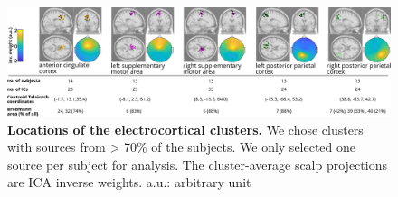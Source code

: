 \documentclass[shortpaper,twoside,web]{ieeecolor}
\begin{document}
\begin{figure}[!ht]
\centerline{\includegraphics{figures/05_dipole locations_70p.jpg}}
\caption{\textbf{Locations of the electrocortical clusters.} We chose clusters with sources from > 70\% of the subjects. We only selected one source per subject for analysis. The cluster-average scalp projections are ICA inverse weights. a.u.: arbitrary unit}
\label{fig5}
\end{figure}
\end{document}
